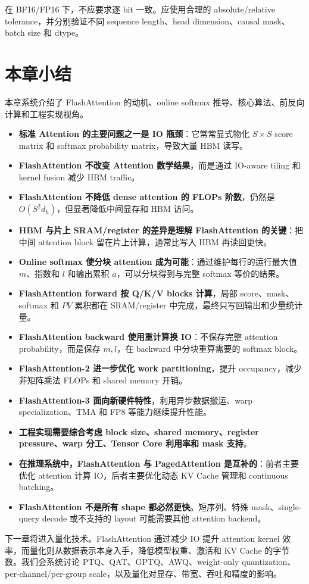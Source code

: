 在 BF16/FP16 下，不应要求逐 bit 一致。应使用合理的 absolute/relative tolerance，并分别验证不同 sequence length、head dimension、causal mask、batch size 和 dtype。

\section{本章小结}
\label{sec:chapter14-summary}

本章系统介绍了 FlashAttention 的动机、online softmax 推导、核心算法、前反向计算和工程实现视角。

\begin{itemize}
\item \textbf{标准 Attention 的主要问题之一是 IO 瓶颈}：它常常显式物化 $S\times S$ score matrix 和 softmax probability matrix，导致大量 HBM 读写。
\item \textbf{FlashAttention 不改变 Attention 数学结果}，而是通过 IO-aware tiling 和 kernel fusion 减少 HBM traffic。
\item \textbf{FlashAttention 不降低 dense attention 的 FLOPs 阶数}，仍然是 $O(S^2d_h)$，但显著降低中间显存和 HBM 访问。
\item \textbf{HBM 与片上 SRAM/register 的差异是理解 FlashAttention 的关键}：把中间 attention block 留在片上计算，通常比写入 HBM 再读回更快。
\item \textbf{Online softmax 使分块 attention 成为可能}：通过维护每行的运行最大值 $m$、指数和 $l$ 和输出累积 $a$，可以分块得到与完整 softmax 等价的结果。
\item \textbf{FlashAttention forward 按 Q/K/V blocks 计算}，局部 score、mask、softmax 和 $PV$ 累积都在 SRAM/register 中完成，最终只写回输出和少量统计量。
\item \textbf{FlashAttention backward 使用重计算换 IO}：不保存完整 attention probability，而是保存 $m,l$，在 backward 中分块重算需要的 softmax block。
\item \textbf{FlashAttention-2 进一步优化 work partitioning}，提升 occupancy，减少非矩阵乘法 FLOPs 和 shared memory 开销。
\item \textbf{FlashAttention-3 面向新硬件特性}，利用异步数据搬运、warp specialization、TMA 和 FP8 等能力继续提升性能。
\item \textbf{工程实现需要综合考虑 block size、shared memory、register pressure、warp 分工、Tensor Core 利用率和 mask 支持}。
\item \textbf{在推理系统中，FlashAttention 与 PagedAttention 是互补的}：前者主要优化 attention 计算 IO，后者主要优化动态 KV Cache 管理和 continuous batching。
\item \textbf{FlashAttention 不是所有 shape 都必然更快}。短序列、特殊 mask、single-query decode 或不支持的 layout 可能需要其他 attention backend。
\end{itemize}

下一章将进入量化技术。FlashAttention 通过减少 IO 提升 attention kernel 效率，而量化则从数据表示本身入手，降低模型权重、激活和 KV Cache 的字节数。我们会系统讨论 PTQ、QAT、GPTQ、AWQ、weight-only quantization、per-channel/per-group scale，以及量化对显存、带宽、吞吐和精度的影响。
